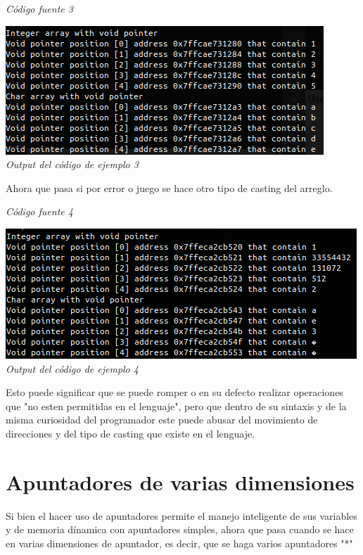 \documentclass[10pt,executivepaper]{article}
\begin{document}

\begin{center}
\textit{Código fuente 3}\\
\end{center}
\begin{center}
\includegraphics[scale=0.5]{screens/screen1.png}\\
\textit{Output del código de ejemplo 3}
\end{center}
Ahora que pasa si por error o juego se hace otro tipo de casting del arreglo.

\begin{center}
\textit{Código fuente 4}\\
\end{center}
\begin{center}
\includegraphics[scale=0.5]{screens/screen2.png}\\
\textit{Output del código de ejemplo 4}
\end{center}
Esto puede significar que se puede romper o en su defecto realizar operaciones que "no esten permitidas en el lenguaje", pero que dentro de su sintaxis y de la misma curiosidad del programador este puede abusar del movimiento de direcciones y del tipo de casting que existe en el lenguaje.
\section{Apuntadores de varias dimensiones}
Si bien el hacer uso de apuntadores permite el manejo inteligente de sus variables y de memoria dínamica con apuntadores simples, ahora que pasa cuando se hace en varias dimensiones de apuntador, es decir, que se haga varios apuntadores "*"
\end{document}
